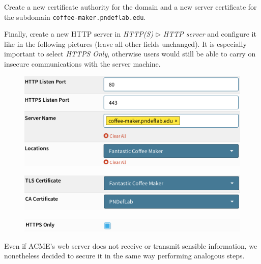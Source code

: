 \documentclass{homework}
\begin{document}
    Create a new certificate authority for the domain and a new server certificate for the subdomain \texttt{coffee-maker.pndeflab.edu}.
    
    Finally, create a new HTTP server in \textit{HTTP(S)} $\triangleright$ \textit{HTTP server} and configure it like in the following pictures (leave all other fields unchanged).
    It is especially important to select \textit{HTTPS Only}, otherwise users would still be able to carry on insecure communications with the server machine.
    \vspace{-5pt}
    \begin{figure}[H]
        \centering
        \includegraphics[width=1\linewidth]{images/http-server-1}
        \label{fig:http-server-1}
    \end{figure}
    \vspace{-20pt}
    \begin{figure}[H]
        \centering
        \includegraphics[width=1\linewidth]{images/http-server-2}
        \label{fig:http-server-2}
    \end{figure}
    \vspace{-20pt}
    \begin{figure}[H]
        \centering
        \includegraphics[width=1\linewidth]{images/http-server-3}
        \label{fig:http-server-3}
    \end{figure}
    \vspace{-20pt}
    
    Even if ACME's web server does not receive or transmit sensible information, we nonetheless decided to secure it in the same way performing analogous steps.
    
\end{document}
